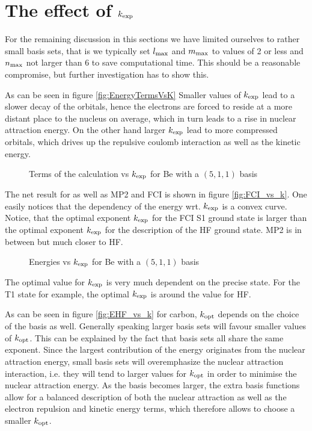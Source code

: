 \section{The effect of $k_\text{exp}$}
For the remaining discussion in this sections
we have limited ourselves to rather small basis sets,
that is we typically set $l_\text{max}$ and $m_\text{max}$ to values
of 2 or less and $n_\text{max}$ not larger than 6
to save computational time.
This should be a reasonable compromise,
but further investigation has to show this.

As can be seen in figure \vref{fig:EnergyTermsVsK}
Smaller values of $k_\text{exp}$ lead to a slower decay of the orbitals,
hence the electrons are forced to reside at a more
distant place to the nucleus on average,
which in turn leads to a rise in nuclear attraction energy.
On the other hand larger $k_\text{exp}$ lead to more compressed orbitals,
which drives up the repulsive coulomb interaction as well as the kinetic energy.

\begin{figure}
	\centering
	\caption{Terms of the \HF calculation vs $k_\text{exp}$ for Be with a $(5,1,1)$ \CS basis}
	\label{fig:EnergyTermsVsK}
\end{figure}

The net result for \HF as well as MP2 and FCI is shown in figure \vref{fig:FCI_vs_k}.
One easily notices that the dependency of the energy wrt. $k_\text{exp}$ is a
convex curve.
Notice, that the optimal exponent $k_\text{exp}$ for the FCI S1 ground state
is larger than the optimal exponent $k_\text{exp}$ for the description
of the HF ground state.
MP2 is in between but much closer to HF.

\begin{figure}
	\centering
	\caption{Energies vs $k_\text{exp}$ for Be with a $(5,1,1)$ \CS basis}
	\label{fig:FCI_vs_k}
\end{figure}

The optimal value for $k_\text{exp}$ is very much dependent on the
precise state.
For the T1 state for example, the optimal $k_\text{exp}$
is around the value for HF.

As can be seen in figure \vref{fig:EHF_vs_k}
for carbon,
$k_\text{opt}$ depends on the choice of the basis as well.
Generally speaking larger basis sets will favour
smaller values of $k_\text{opt}$.
This can be explained by the fact that \CS basis sets
all share the same exponent.
Since the largest contribution of the \HF energy
originates from the nuclear attraction energy,
small basis sets will overemphasize
the nuclear attraction interaction,
i.e. they will tend to larger values for $k_\text{opt}$
in order to minimise the nuclear attraction energy.
As the basis becomes larger,
the extra basis functions allow for a balanced
description of both the nuclear attraction
as well as the electron repulsion
and kinetic energy terms,
which therefore allows to choose a smaller $k_\text{opt}$.

